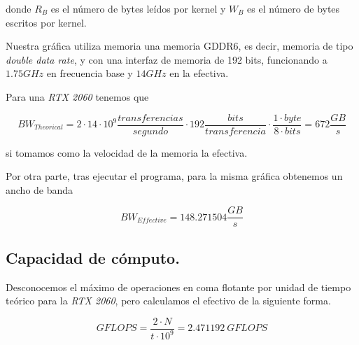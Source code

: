 donde $R_{B}$ es el número de bytes leídos por kernel y $W_{B}$ es el número de bytes
escritos por kernel.

\pagebreak

Nuestra gráfica utiliza memoria una memoria GDDR6, es decir, memoria de tipo \textit{double data rate},
y con una interfaz de memoria de 192 bits, funcionando a $1.75GHz$ en frecuencia base y $14GHz$ en la efectiva.

Para una \textit{RTX 2060} tenemos que

$$ BW_{Theorical} = 2 \cdot 14 \cdot 10^{9} \frac{transferencias}{segundo} \cdot 192 \frac{bits}{transferencia} \cdot \frac{1 \cdot byte}{ 8 \cdot bits} = 672 \frac{GB}{s} $$

si tomamos como la velocidad de la memoria la efectiva.

Por otra parte, tras ejecutar el programa, para la misma gráfica obtenemos un ancho de banda

$$ BW_{Effective} = 148.271504 \frac{GB}{s} $$

\subsection{Capacidad de cómputo.}

Desconocemos el máximo de operaciones en coma flotante por unidad de tiempo teórico para la \textit{RTX 2060}, pero calculamos el efectivo de la siguiente forma.

$$ GFLOPS = \frac{2 \cdot N}{t \cdot 10^{9}} = 2.471192 \ GFLOPS $$

